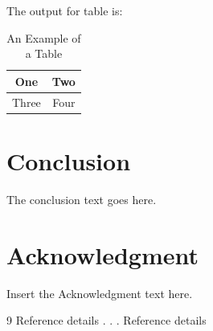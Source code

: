 \documentclass{article}
\begin{document}
\noindent The output for table is:

\begin{table}[!h]
\caption{An Example of a Table}%
\label{table_example}
\centering
\begin{tabular}{|c||c|}%
\hline
One & Two\\ %
\hline
Three & Four\\%
\hline
\end{tabular}
\end{table}%

\section{Conclusion}
The conclusion text goes here.

\section*{Acknowledgment}

Insert the Acknowledgment text here.

\begin{thebibliography}{9}
Reference details
.
.
.
Reference details
\end{thebibliography}
\end{document}
